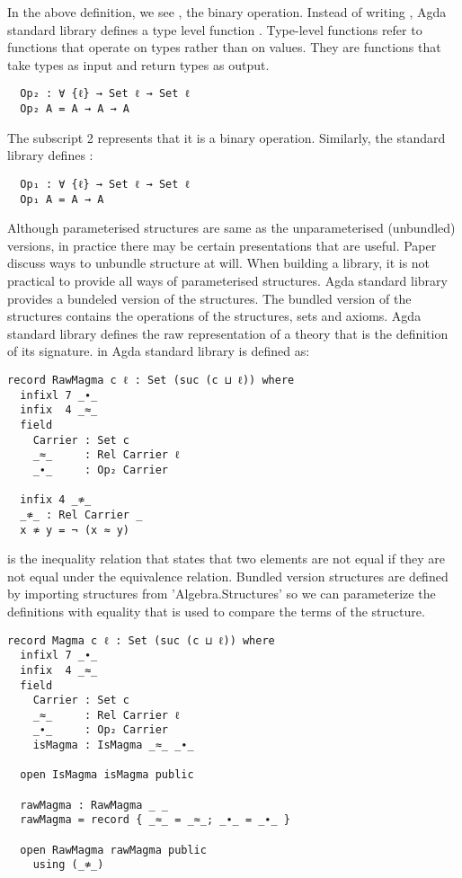 In the above definition, we see , the binary operation.
Instead of writing , Agda standard library defines a type
level function . Type-level functions refer to functions that
operate on types rather than on values. They are functions that take types as
input and return types as output.

\begin{verbatim}
  Op₂ : ∀ {ℓ} → Set ℓ → Set ℓ
  Op₂ A = A → A → A
\end{verbatim}

The subscript 2 represents that it is a binary operation. Similarly, the
standard library defines :

\begin{verbatim}
  Op₁ : ∀ {ℓ} → Set ℓ → Set ℓ
  Op₁ A = A → A
\end{verbatim}

Although parameterised structures are same as the unparameterised (unbundled)
versions, in practice there may be certain presentations that are useful. Paper
\cite{al2019language} discuss ways to unbundle structure at will. When building
a library, it is not practical to provide all ways of parameterised structures.
Agda standard library provides a bundeled version of the structures. The bundled
version of the structures contains the operations of the structures, sets and
axioms. Agda standard library defines the raw representation of a theory that is
the definition of its signature.  in Agda standard library is defined as:

\begin{verbatim}
record RawMagma c ℓ : Set (suc (c ⊔ ℓ)) where
  infixl 7 _∙_
  infix  4 _≈_
  field
    Carrier : Set c
    _≈_     : Rel Carrier ℓ
    _∙_     : Op₂ Carrier

  infix 4 _≉_
  _≉_ : Rel Carrier _
  x ≉ y = ¬ (x ≈ y)
\end{verbatim}

 is the inequality relation that states that two elements are not
equal  if they are not equal under the equivalence relation.
Bundled version structures are defined by importing structures from
'Algebra.Structures' so we can parameterize the definitions with equality that
is used to compare the terms of the structure.

\begin{verbatim}
record Magma c ℓ : Set (suc (c ⊔ ℓ)) where
  infixl 7 _∙_
  infix  4 _≈_
  field
    Carrier : Set c
    _≈_     : Rel Carrier ℓ
    _∙_     : Op₂ Carrier
    isMagma : IsMagma _≈_ _∙_

  open IsMagma isMagma public

  rawMagma : RawMagma _ _
  rawMagma = record { _≈_ = _≈_; _∙_ = _∙_ }

  open RawMagma rawMagma public
    using (_≉_)
\end{verbatim}

